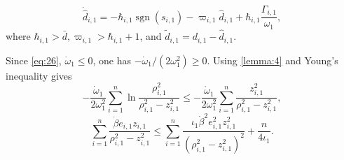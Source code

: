 \documentclass[pdflatex,sn-mathphys-num]{sn-jnl}%
\theoremstyle{thmstyleone}%
\theoremstyle{thmstyletwo}%
\theoremstyle{thmstylethree}%
\begin{document}
 
\begin{equation}\label{eq:32}
      \dot{\hat d}_{i,1} = -\hbar_{i,1} \operatorname{sgn}(s_{i,1})-\varpi_{i,1} {\hat d}_{i,1}+\hbar_{i,1}\frac{\varGamma_{i,1}}{{\omega}_{1}},
\end{equation}
where $\hbar_{i,1} >\bar{d}, \varpi_{i,1}>\hbar_{i,1}+1$, and $\tilde{d}_{i,1} = d_{i,1} - \hat{d}_{i,1}$.

Since \cref{eq:26}, $\dot{\omega}_{1} \leq 0$, one has $-\dot{\omega}_{1}/(2 \omega_{1}^{2}) \geq 0$. Using \cref{lemma:4} and Young's inequality gives
		\begin{equation}\label{eq:33}
-\frac{\dot{\omega}_{1}}{2 \omega_{1}^{2}}\sum_{i=1}^{n}\ln\frac{\rho_{i,1}^{2}}{\rho_{i,1}^{2}-z_{i,1}^{2}}
\leq -\frac{\dot{\omega}_{1}}{2 \omega_{1}^{2}}\sum_{i=1}^{n}\frac{z_{i,1}^{2}}{\rho_{i,1}^{2}-z_{i,1}^{2}},
	\end{equation}
		\begin{equation}\label{eq:34}
			\sum_{i=1}^{n} \frac{\dot{\beta} e_{i,1} z_{i,1}}{\rho_{i,1}^{2} - z_{i,1}^{2}} 
			\leq 
			 \sum_{i=1}^{n} \frac{\iota_1  \dot{\beta}^{2} e_{i,1}^{2} z_{i,1}^{2}}{(\rho_{i,1}^{2} - z_{i,1}^{2})^{2}} 
			+ \frac{n}{4\iota_1}.
			\end{equation}
			
\end{document}
